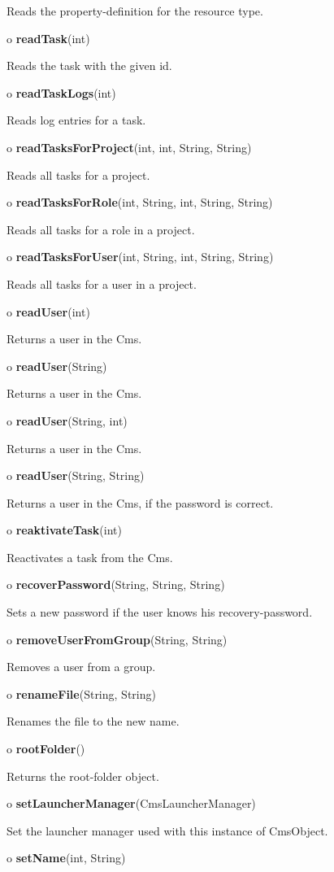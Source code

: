 \begin{description}
Reads the property-definition for the resource type.  
\item o {\bf readTask}(int)  

Reads the task with the given id.  
\item o {\bf readTaskLogs}(int)  

Reads log entries for a task.  
\item o {\bf readTasksForProject}(int, int, String, String)  

Reads all tasks for a project.  
\item o {\bf readTasksForRole}(int, String, int, String, String)  

Reads all tasks for a role in a project.  
\item o {\bf readTasksForUser}(int, String, int, String, String)  

Reads all tasks for a user in a project.  
\item o {\bf readUser}(int)  

Returns a user in the Cms.  
\item o {\bf readUser}(String)  

Returns a user in the Cms.  
\item o {\bf readUser}(String, int)  

Returns a user in the Cms.  
\item o {\bf readUser}(String, String)  

Returns a user in the Cms, if the password is correct.  
\item o {\bf reaktivateTask}(int)  

Reactivates a task from the Cms.  
\item o {\bf recoverPassword}(String, String, String)  

Sets a new password if the user knows his recovery-password.  
\item o {\bf removeUserFromGroup}(String, String)  

Removes a user from a group.  
\item o {\bf renameFile}(String, String)  

Renames the file to the new name.  
\item o {\bf rootFolder}()  

Returns the root-folder object.  
\item o {\bf setLauncherManager}(CmsLauncherManager)  

Set the launcher manager used with this instance of CmsObject.  
\item o {\bf setName}(int, String)  


\end{description}
